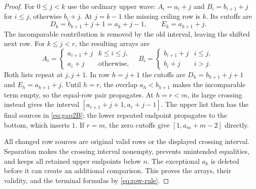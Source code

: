 \begin{proof}
For $0\le j<k$ use the ordinary upper wave: $A_i=a_i+j$ and $B_i=b_{i+1}+j$ for $i\le j$, otherwise $b_i+j$. At $j=k-1$ the missing ceiling row is $k$. Its cutoffs are
\[
 D_k=b_{k+1}+j+1=a_k+j-1,\qquad E_k=a_{k+1}+j.
\]
The incomparable contribution is removed by the old interval, leaving the shifted next row. For $k\le j<r$, the resulting arrays are
\[
 A_i=\begin{cases}a_{i+1}+j&k\le i\le j,\\a_i+j&\text{otherwise},\end{cases}
 \quad
 B_i=\begin{cases}b_{i+1}+j&i\le j,\\b_i+j&i>j.\end{cases}
\]
Both lists repeat at $j,j+1$. In row $h=j+1$ the cutoffs are $D_h=b_{h+1}+j+1$ and $E_h=a_{h+1}+j$. Until $h=r$, the overlap $a_h<b_{h+1}$ makes the incomparable term empty, so the equal-row pair propagates. At $h=r<m$, its large crossing instead gives the interval $[a_{r+1}+j+1,a_r+j-1]$. The upper list then has the final sources in \eqref{eq:gap2B}; the lower repeated endpoint propagates to the bottom, which inserts $1$. If $r=m$, the zero cutoffs give $[1,a_m+m-2]$ directly.

All changed row sources are original valid rows or the displayed crossing interval. Separation makes the crossing interval nonempty, prevents unintended equalities, and keeps all retained upper endpoints below $n$. The exceptional $a_k$ is deleted before it can create an additional comparison. This proves the arrays, their validity, and the terminal formulas by \eqref{eq:row-rule}.
\end{proof}

